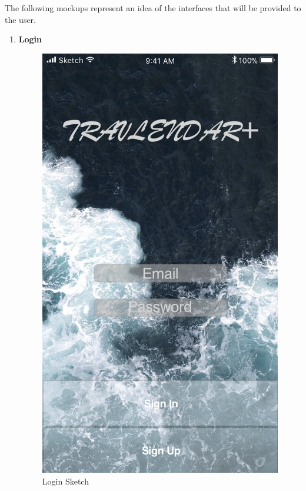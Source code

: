 The following mockups represent an idea of the interfaces that will be provided to the user.
\begin{enumerate}
	\setlength{\leftskip}{1cm}
	\item \textbf{Login}
			\begin{figure}[H]
				\centering
				\includegraphics[scale=0.25]{Images/Sketch/Login}
				\caption{Login Sketch}
			\end{figure}
			\newpage

\end{enumerate}

